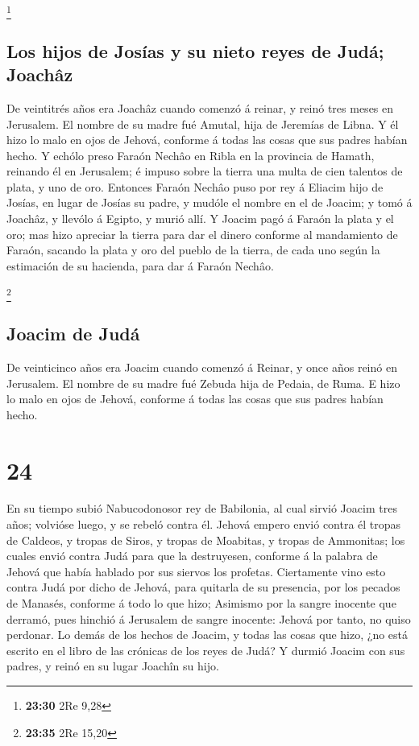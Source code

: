 \footnote{\textbf{23:30} 2Re 9,28}

\hypertarget{los-hijos-de-josuxedas-y-su-nieto-reyes-de-juduxe1-joachuxe2z}{%
\subsection{Los hijos de Josías y su nieto reyes de Judá;
Joachâz}\label{los-hijos-de-josuxedas-y-su-nieto-reyes-de-juduxe1-joachuxe2z}}

 De veintitrés años era Joachâz cuando comenzó á reinar, y
reinó tres meses en Jerusalem. El nombre de su madre fué Amutal, hija de
Jeremías de Libna.  Y él hizo lo malo en ojos de Jehová,
conforme á todas las cosas que sus padres habían hecho.  Y
echólo preso Faraón Nechâo en Ribla en la provincia de Hamath, reinando
él en Jerusalem; é impuso sobre la tierra una multa de cien talentos de
plata, y uno de oro.  Entonces Faraón Nechâo puso por rey á
Eliacim hijo de Josías, en lugar de Josías su padre, y mudóle el nombre
en el de Joacim; y tomó á Joachâz, y llevólo á Egipto, y murió allí.
 Y Joacim pagó á Faraón la plata y el oro; mas hizo
apreciar la tierra para dar el dinero conforme al mandamiento de Faraón,
sacando la plata y oro del pueblo de la tierra, de cada uno según la
estimación de su hacienda, para dar á Faraón Nechâo.

\footnote{\textbf{23:35} 2Re 15,20}

\hypertarget{joacim-de-juduxe1}{%
\subsection{Joacim de Judá}\label{joacim-de-juduxe1}}

 De veinticinco años era Joacim cuando comenzó á Reinar, y
once años reinó en Jerusalem. El nombre de su madre fué Zebuda hija de
Pedaia, de Ruma.  E hizo lo malo en ojos de Jehová,
conforme á todas las cosas que sus padres habían hecho.

\hypertarget{section-23}{%
\section{24}\label{section-23}}

 En su tiempo subió Nabucodonosor rey de Babilonia, al cual
sirvió Joacim tres años; volvióse luego, y se rebeló contra él.
 Jehová empero envió contra él tropas de Caldeos, y tropas
de Siros, y tropas de Moabitas, y tropas de Ammonitas; los cuales envió
contra Judá para que la destruyesen, conforme á la palabra de Jehová que
había hablado por sus siervos los profetas.  Ciertamente
vino esto contra Judá por dicho de Jehová, para quitarla de su
presencia, por los pecados de Manasés, conforme á todo lo que hizo;
 Asimismo por la sangre inocente que derramó, pues hinchió á
Jerusalem de sangre inocente: Jehová por tanto, no quiso perdonar.
 Lo demás de los hechos de Joacim, y todas las cosas que
hizo, ¿no está escrito en el libro de las crónicas de los reyes de Judá?
 Y durmió Joacim con sus padres, y reinó en su lugar Joachîn
su hijo.


